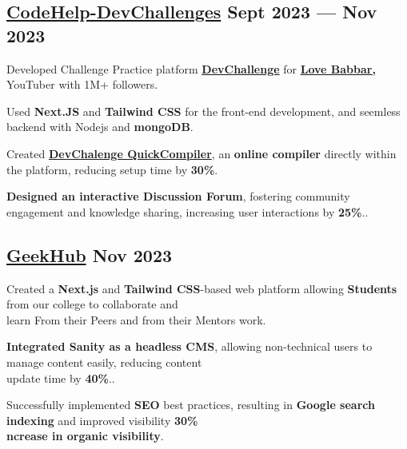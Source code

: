 \subsection{{\href{https://www.codehelp.in/devchallenge/dashboard}{CodeHelp-DevChallenges} \hfill Sept 2023 — Nov 2023}}
\begin{zitemize}
\item Developed Challenge Practice platform \textbf{\href{https://www.codehelp.in/devchallenge/dashboard}{DevChallenge}} for \textbf{\href{https://www.youtube.com/@LoveBabbar}{Love Babbar,}} YouTuber with 1M+ followers.
\item Used \textbf{Next.JS} and \textbf{Tailwind CSS} for the front-end development, and seemless backend with Nodejs and \textbf{mongoDB}.
\item Created \href{https://www.codehelp.in/devchallenge/dashboard}{\textbf{DevChalenge QuickCompiler}}, an \textbf{online compiler} directly within the platform, reducing setup time by \textbf{30\%}. 
\item \textbf{Designed an interactive Discussion Forum}, fostering community engagement and knowledge sharing, increasing user interactions by \textbf{25\%}..
\end{zitemize}

\subsection{{\href{https://geekhub-uiet.club/}{GeekHub} \hfill Nov 2023}}
\begin{zitemize}
\item Created a \textbf{Next.js} and \textbf{Tailwind CSS}-based web platform allowing \textbf{Students} from our college to 
collaborate and \\ learn From their Peers and from their Mentors work.
    \item \textbf{Integrated Sanity as a headless CMS}, allowing non-technical users to manage content easily,  reducing content \\update time by \textbf{40\%}..
\item Successfully implemented \textbf{SEO} best practices, resulting in \textbf{Google search indexing} and improved visibility  \textbf{30\%  \\ncrease in organic visibility}.
\end{zitemize}
